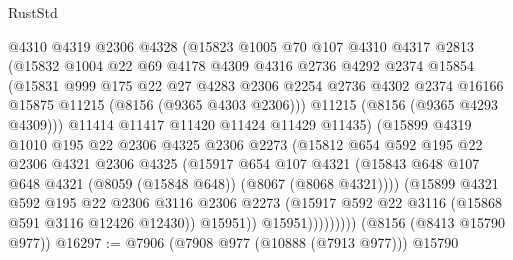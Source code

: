 \begin{lexlean}{RustStd}
\begin{coremodule}
{\begin{coremodule}
{{{{{{{{{{{{{{{{{{{{{{{{{{{{{{{{{{                    @4310
                    @4319
                    @2306
                    @4328
                    (@15823
                      @1005
                      @70
                      @107
                      @4310
                      @4317
                      @2813
                      (@15832
                        @1004
                        @22
                        @69
                        @4178
                        @4309
                        @4316
                        @2736
                        @4292
                        @2374
                        @15854
                        (@15831
                          @999
                          @175
                          @22
                          @27
                          @4283
                          @2306
                          @2254
                          @2736
                          @4302
                          @2374
                          @16166
                          @15875
                          @11215
                          (@8156 (@9365 @4303 @2306)))
                        @11215
                        (@8156 (@9365 @4293 @4309)))
                      @11414
                      @11417
                      @11420
                      @11424
                      @11429
                      @11435)
                    (@15899
                      @4319
                      @1010
                      @195
                      @22
                      @2306
                      @4325
                      @2306
                      @2273
                      (@15812
                        @654
                        @592
                        @195
                        @22
                        @2306
                        @4321
                        @2306
                        @4325
                        (@15917
                          @654
                          @107
                          @4321
                          (@15843 @648 @107 @648 @4321 (@8059 (@15848 @648)) (@8067 (@8068 @4321))))
                        (@15899
                          @4321
                          @592
                          @195
                          @22
                          @2306
                          @3116
                          @2306
                          @2273
                          (@15917 @592 @22 @3116 (@15868 @591 @3116 @12426 @12430))
                          @15951))
                      @15951)))))))))
    (@8156 (@8413 @15790 @977))
@16297 := @7906 (@7908 @977 (@10888 (@7913 @977))) @15790
}}}}}}}}}}}}}}}}}}}}}}}}}}}}}}}}}}
\end{coremodule}}
\end{coremodule}
\end{lexlean}
